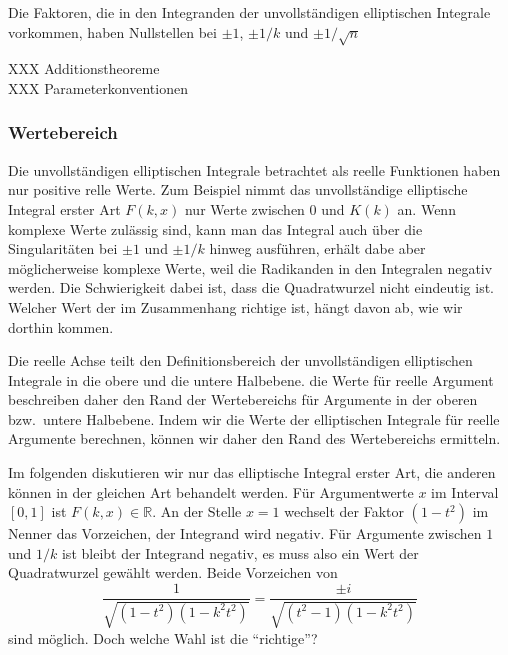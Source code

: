 Die Faktoren, die in den Integranden der unvollständigen elliptischen
Integrale vorkommen, haben Nullstellen bei $\pm1$, $\pm1/k$ und
$\pm 1/\sqrt{n}$

XXX Additionstheoreme \\
XXX Parameterkonventionen \\

\subsubsection{Wertebereich}
Die unvollständigen elliptischen Integrale betrachtet als reelle Funktionen
haben nur positive relle Werte.
Zum Beispiel nimmt das unvollständige elliptische Integral erster Art
$F(k,x)$ nur Werte zwischen $0$ und $K(k)$ an.
Wenn komplexe Werte zulässig sind, kann man das Integral auch über die 
Singularitäten bei $\pm 1$ und $\pm 1/k$ hinweg ausführen, erhält
dabe aber möglicherweise komplexe Werte, weil die Radikanden in den
Integralen negativ werden.
Die Schwierigkeit dabei ist, dass die Quadratwurzel nicht eindeutig ist.
Welcher Wert der im Zusammenhang richtige ist, hängt davon ab, wie wir
dorthin kommen.

Die reelle Achse teilt den Definitionsbereich der unvollständigen
elliptischen Integrale in die obere und die untere Halbebene.
die Werte für reelle Argument beschreiben daher den Rand der Wertebereichs
für Argumente in der oberen bzw.~untere Halbebene.
Indem wir die Werte der elliptischen Integrale für reelle Argumente
berechnen, können wir daher den Rand des Wertebereichs ermitteln.

Im folgenden diskutieren wir nur das elliptische Integral erster Art,
die anderen können in der gleichen Art behandelt werden.
Für Argumentwerte $x$ im Interval $[0,1]$ ist $F(k,x)\in\mathbb{R}$.
An der Stelle $x=1$ wechselt der Faktor $(1-t^2)$ im Nenner das
Vorzeichen, der Integrand wird negativ.
Für Argumente zwischen $1$ und $1/k$ ist bleibt der Integrand negativ,
es muss also ein Wert der Quadratwurzel gewählt werden.
Beide Vorzeichen von
\begin{equation}
\frac{1}{\sqrt{(1-t^2)(1-k^2t^2)}}
=
\frac{\pm i}{\sqrt{(t^2-1)(1-k^2t^2)}}
\label{buch:elliptisch:eqn:imaginaerintegrand}
\end{equation}
sind möglich.
Doch welche Wahl ist die ``richtige''?


